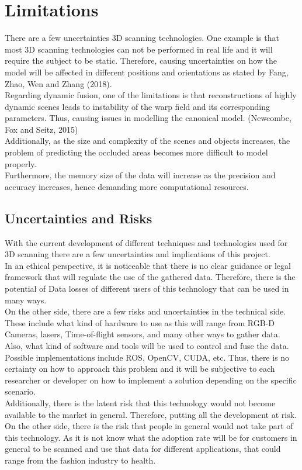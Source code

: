 \documentclass[a4paper]{article}
\begin{document}
\section*{{Limitations}}
There are a few uncertainties 3D scanning technologies. One example is that most 3D scanning technologies can not be performed in real life and it will require the subject to be static. Therefore, causing uncertainties on how the model will be affected in different positions and orientations as stated by Fang, Zhao, Wen and Zhang (2018).\\
Regarding dynamic fusion, one of the limitations is that reconstructions of highly dynamic scenes leads to instability of the warp field and its corresponding parameters. Thus, causing issues in modelling the canonical model.  (Newcombe, Fox and Seitz, 2015)\\
Additionally, as the size and complexity of the scenes and objects increases, the problem of predicting the occluded areas becomes more difficult to model properly. \\
Furthermore, the memory size of the data will increase as the precision and accuracy increases, hence demanding more computational resources. 
\subsection*{Uncertainties and Risks}
With the current development of different techniques and technologies used for 3D scanning there are a few uncertainties and implications of this project. \\[10pt]
In an ethical perspective, it is noticeable that there is no clear guidance or legal framework that will regulate the use of the gathered data. Therefore, there is the potential of Data losses of different users of this technology that can be used in many ways. \\[10pt]
On the other side, there are a few risks and uncertainties in the technical side. These include what kind of hardware to use as this will range from RGB-D Cameras, lasers, Time-of-flight sensors, and many other ways to gather data. Also, what kind of software and tools will be used to control and fuse the data.
 Possible implementations include ROS, OpenCV, CUDA, etc. Thus, there is no certainty on how to approach this problem and it will be subjective to each researcher or developer on how to implement a solution depending on the specific scenario. \\ [10pt]
Additionally, there is the latent risk that this technology would not become available to the market in general. Therefore, putting all the development at risk. On the other side, there is the risk that people in general would not take part of this technology. As it is not know what the adoption rate will be for customers in general to be scanned and use that data for different applications, that could range from the fashion industry to health. 

\newpage


\nocite{*}   %

\end{document}
